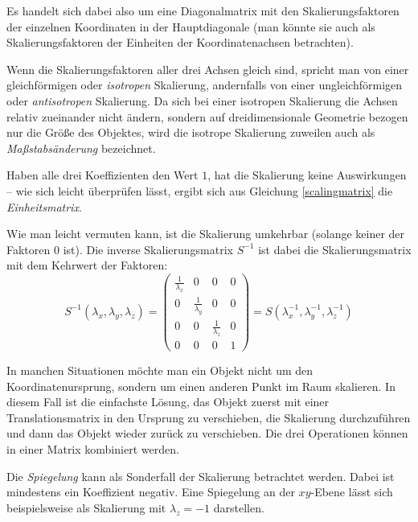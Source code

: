 Es handelt sich dabei also um eine Diagonalmatrix mit den Skalierungsfaktoren der einzelnen Koordinaten in der Hauptdiagonale (man könnte sie auch als Skalierungsfaktoren der Einheiten der Koordinatenachsen betrachten).

Wenn die Skalierungsfaktoren aller drei Achsen gleich sind, spricht man von einer gleichförmigen oder \emph{isotropen} Skalierung, andernfalls von einer ungleichförmigen oder \emph{antisotropen} Skalierung. Da sich bei einer isotropen Skalierung die Achsen relativ zueinander nicht ändern, sondern auf dreidimensionale Geometrie bezogen nur die Größe des Objektes, wird die isotrope Skalierung zuweilen auch als \emph{Maßstabsänderung} bezeichnet.

Haben alle drei Koeffizienten den Wert $1$, hat die Skalierung keine Auswirkungen -- wie sich leicht überprüfen lässt, ergibt sich aus Gleichung \ref{scalingmatrix} die \emph{Einheitsmatrix}.

Wie man leicht vermuten kann, ist die Skalierung umkehrbar (solange keiner der Faktoren $0$ ist). Die inverse Skalierungsmatrix $S^{-1}$ ist dabei die Skalierungsmatrix mit dem Kehrwert der Faktoren:
\begin{equation}
 S^{-1}{(\lambda_x, \lambda_y, \lambda_z)} =
 \begin{pmatrix}
  \frac{1}{\lambda_x} & 0 & 0 & 0 \\
  0 & \frac{1}{\lambda_y} & 0 & 0 \\
  0 & 0 & \frac{1}{\lambda_z} & 0 \\
  0 & 0 & 0 & 1
 \end{pmatrix}
 = S{(\lambda_x^{-1}, \lambda_y^{-1}, \lambda_z^{-1})}
\end{equation}


In manchen Situationen möchte man ein Objekt nicht um den Koordinatenursprung, sondern um einen anderen Punkt im Raum skalieren. In diesem Fall ist die einfachste Lösung, das Objekt zuerst mit einer Translationsmatrix in den Ursprung zu verschieben, die Skalierung durchzuführen und dann das Objekt wieder zurück zu verschieben. Die drei Operationen können in einer Matrix kombiniert werden.


Die \emph{Spiegelung} kann als Sonderfall der Skalierung betrachtet werden. Dabei ist mindestens ein Koeffizient negativ. Eine Spiegelung an der $xy$-Ebene lässt sich beispielsweise als Skalierung mit $\lambda_z = -1$ darstellen.

